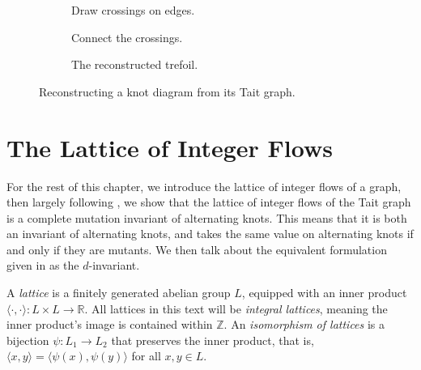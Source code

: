 \documentclass[12pt]{report}
\newcommand{\R}{\mathbb{R}}
\newcommand{\Z}{\mathbb{Z}}
\newcommand{\ip}[2]{\langle #1, #2 \rangle}
\begin{document}
\begin{figure}[h]
	\centering
	\hspace*{\fill}
	\begin{subfigure}[b]{0.3 \textwidth}
		\centering
		\def\svgscale{0.22}
		
		\caption{Draw crossings on edges.}
		\label{fig:trefoil-tait-with-crossings}
	\end{subfigure}
	\hspace*{\fill}
	\begin{subfigure}[b]{0.3 \textwidth}
		\centering
		\def\svgscale{0.22}
		
		\caption{Connect the crossings.}
		\label{fig:trefoil-resconstructed}
	\end{subfigure}
	\hspace*{\fill}
	\begin{subfigure}[b]{0.3 \textwidth}
		\centering
		\def\svgscale{0.2}
		
		\caption{The reconstructed trefoil.}
		\label{fig:trefoil-resconstructed-isotopy}
	\end{subfigure}
	\hspace*{\fill}
	\caption{Reconstructing a knot diagram from its Tait graph.}
	\label{fig:tait-reconstruction-example}
\end{figure}

\section{The Lattice of Integer Flows}

For the rest of this chapter, we introduce the lattice of integer flows of a graph, then largely following \cite{lattices-graphs-mutation}, we show that the lattice of integer flows of the Tait graph is a complete mutation invariant of alternating knots. This means that it is both an invariant of alternating knots, and takes the same value on alternating knots if and only if they are mutants. We then talk about the equivalent formulation given in \cite{lattices-graphs-mutation} as the $d$-invariant.

A \textit{lattice} is a finitely generated abelian group $L$, equipped with an inner product 
\({\ip{\cdot}{\cdot}: L \times L \longrightarrow \R}\). All lattices in this text will be \textit{integral lattices}, meaning the inner product's image is contained within $\Z$. An \textit{isomorphism of lattices} is a bijection $\psi: L_{1} \longrightarrow L_{2}$ that preserves the inner product, that is, ${\ip{x}{y} = \ip{\psi(x)}{\psi(y)}}$ for all $x, y \in L$.
\end{document}
